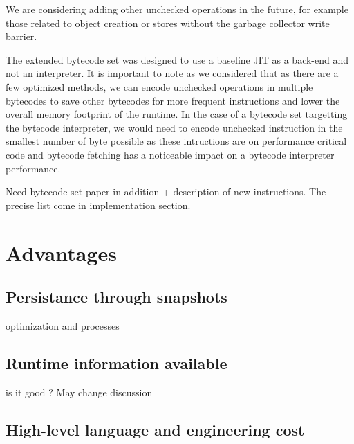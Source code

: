 \documentclass[a4paper,12pt,twoside]{../includes/ThesisStyle}
\begin{document}
We are considering adding other unchecked operations in the future, for example those related to object creation or stores without the garbage collector write barrier.

The extended bytecode set was designed to use a baseline JIT as a back-end and not an interpreter. It is important to note as we considered that as there are a few optimized methods, we can encode unchecked operations in multiple bytecodes to save other bytecodes for more frequent instructions and lower the overall memory footprint of the runtime. In the case of a bytecode set targetting the bytecode interpreter, we would need to encode unchecked instruction in the smallest number of byte possible as these intructions are on performance critical code and bytecode fetching has a noticeable impact on a bytecode interpreter performance.



Need bytecode set paper in addition + description of new instructions. The precise list come in implementation section.

\section{Advantages}

\subsection{Persistance through snapshots}

optimization and processes

\subsection{Runtime information available}

is it good ? May change discussion

\subsection{High-level language and engineering cost}
\end{document}

